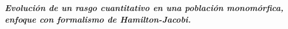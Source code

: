 \documentclass[letterpaper]{article}
\newcommand{\Title}[1]{\begin{center}\LARGE\textbf{\textit{#1}}\end{center}}
\begin{document}
\Title{Evoluci\'on de un rasgo cuantitativo en una poblaci\'on monom\'orfica, enfoque con formalismo de Hamilton-Jacobi.}


\begingroup
\setlength{\parindent}{1.5em}
\setlength{\parskip}{0pt}
\tableofcontents
\endgroup
\clearpage







\clearpage


\end{document}
